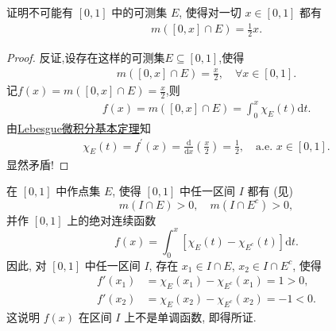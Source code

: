 \documentclass[../../main.tex]{subfiles}%
\begin{document}
\begin{example}
证明不可能有 $[0,1]$ 中的可测集 $E$, 使得对一切 $x\in[0,1]$ 都有
\begin{align*}
m([0,x]\cap E)=\frac{1}{2}x.
\end{align*}
\end{example}
\begin{proof}
反证,设存在这样的可测集$E\subseteq [0,1]$,使得
\begin{align*}
m\left( [0,x] \cap E \right) =\frac{x}{2},\quad \forall x\in [0,1].
\end{align*}
记$f\left( x \right) =m\left( [0,x] \cap E \right) =\frac{x}{2}$,则
\begin{align*}
f\left( x \right) =m\left( [0,x] \cap E \right) =\int_0^x{\chi _E\left( t \right) \mathrm{d}t}.
\end{align*}
由\hyperref[corollary:Lebesgue微积分基本定理]{Lebesgue微积分基本定理}知
\begin{align*}
\chi _E\left( t \right) =f^\prime \left( x \right) =\frac{\mathrm{d}}{\mathrm{d}x}\left( \frac{x}{2} \right) =\frac{1}{2},\quad \mathrm{a}.\mathrm{e}.\,\,x\in [0,1].
\end{align*}
显然矛盾!
\end{proof}

\begin{example}[无处单调的绝对连续函数]
在 $[0,1]$ 中作点集 $E$, 使得 $[0,1]$ 中任一区间 $I$ 都有 (见)
\[
m(I\cap E) > 0,\quad m(I\cap E^c) > 0,
\]
并作 $[0,1]$ 上的绝对连续函数
\[
f(x) = \int_0^x [\chi_E(t) - \chi_{E^c}(t)]\mathrm{d}t.
\]
因此, 对 $[0,1]$ 中任一区间 $I$, 存在 $x_1\in I\cap E$, $x_2\in I\cap E^c$, 使得
\begin{align*}
f'(x_1) &= \chi_E(x_1) - \chi_{E^c}(x_1) = 1 > 0, \\
f'(x_2) &= \chi_E(x_2) - \chi_{E^c}(x_2) = -1 < 0.
\end{align*}
这说明 $f(x)$ 在区间 $I$ 上不是单调函数, 即得所证.
\end{example}
\end{document}
